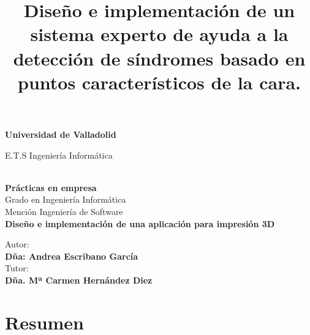 \documentclass[a4paper,11pt, twoside]{article}
\title{Diseño e implementación de un sistema experto de ayuda a la detección de síndromes basado en puntos característicos de la cara.}
\newcommand\blankpage{\null\thispagestyle{empty}\addtocounter{page}{-1}\newpage}
\begin{document}
\renewcommand{\listtablename}{Índice de tablas}

\afterpage{\blankpage}    
\begin{titlepage}
        \begin{center}
            \vfill
            { \fontsize{18}{21.6}\selectfont \textbf{Universidad de Valladolid}}
            \\
            \vspace*{1in}
            \begin{large}
                {\fontsize{26}{31.2}\selectfont E.T.S Ingeniería Informática}
            \end{large}\\
            \vspace*{0.25in}
            { \fontsize{13}{15.6}\selectfont \textbf{Prácticas en empresa}}\\
            \vspace*{0.6in}
            {\fontsize{16}{19.2}\selectfont Grado en Ingeniería Informática\\
Mención Ingeniería de Software}\\
            \vspace*{0.8in}
            {\fontsize{28}{33.6}\selectfont \textbf{Diseño e implementación de una aplicación para impresión 3D}}\\
            \vspace*{1.1in}
            \begin{flushright}
                {\fontsize{17.28}{20.74}\selectfont Autor:\\
                \textbf{Dña: Andrea Escribano García} \\}
                \vspace*{0.1in}
                { \fontsize{17.28}{20.74}\selectfont
                Tutor:\\
                \textbf{Dña. Mª Carmen Hernández Diez }\\}
            \end{flushright}

        \end{center}
    \end{titlepage}
    
\setlength{\parindent}{0.5cm}
\setcounter{page}{1}
\section*{Resumen}
\end{document}
